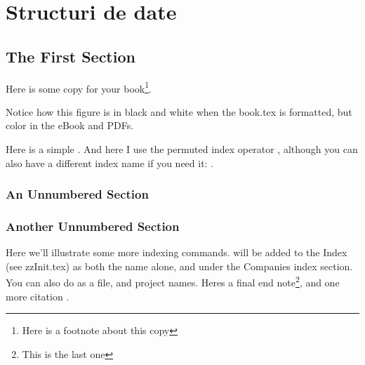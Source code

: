 \chapter{Structuri de date}
\label{abody}%

\section{The First Section}

Here is some copy for your book\footnote{Here is a footnote about this copy}.


Notice how this figure is in black and white when the book.tex is formatted, but color in the eBook and PDFs.

Here is a simple . And here I use the permuted index operator , although you can also have a different index name if you need it: .

\subsection*{An Unnumbered Section}

\lipsum[9-15]

\subsection*{Another Unnumbered Section}

\lipsum[16-22]

Here we'll illustrate some more indexing commands.  will be added to the Index (see zzInit.tex) as both the name alone,
and under the Companies index section. You can also do  as a file, and  project names. Heres a final end note\footnote{This is the last one}, and one more citation \cite{Pfister2013}.


